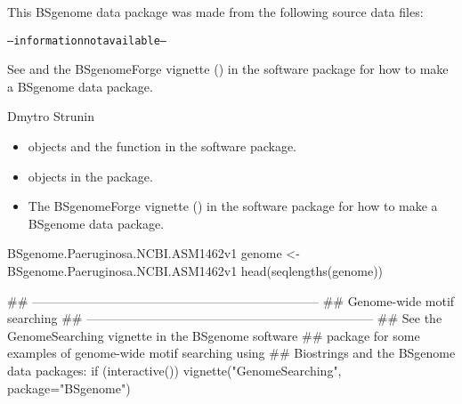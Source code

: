 \documentclass[a4paper]{book}
\begin{document}
%
\begin{Note}\relax
This BSgenome data package was made from the following source data files:
\begin{alltt}
-- information not available --
  \end{alltt}


See  and the BSgenomeForge
vignette () in the 
software package for how to make a BSgenome data package.
\end{Note}
%
\begin{Author}\relax
Dmytro Strunin
\end{Author}
%
\begin{SeeAlso}\relax
\begin{itemize}

\item{}  objects and the
 function
in the  software package.
\item{}  objects in the 
package.
\item{} The BSgenomeForge vignette ()
in the  software package for how to make a BSgenome
data package.

\end{itemize}

\end{SeeAlso}
%
\begin{Examples}
\begin{ExampleCode}
BSgenome.Paeruginosa.NCBI.ASM1462v1
genome <- BSgenome.Paeruginosa.NCBI.ASM1462v1
head(seqlengths(genome))


## ---------------------------------------------------------------------
## Genome-wide motif searching
## ---------------------------------------------------------------------
## See the GenomeSearching vignette in the BSgenome software
## package for some examples of genome-wide motif searching using
## Biostrings and the BSgenome data packages:
if (interactive())
    vignette("GenomeSearching", package="BSgenome")
\end{ExampleCode}
\end{Examples}
\printindex{}
\end{document}
